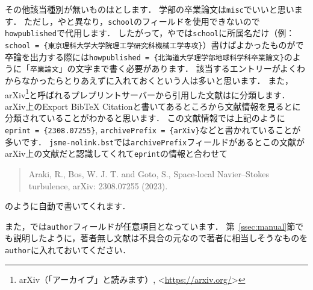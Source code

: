 \documentclass[a4paper,fleqn,uplatex,dvipdfmx]{jsarticle}
\newcommand{\jsmefile}{\texttt{jsme-nolink.bst}}
\begin{document}
その他該当種別が無いものは\ttmisc とします．
学部の卒業論文は\verb|misc|でいいと思います．
ただし，\ttmastersthesis や\ttphdthesis と異なり，\verb|school|のフィールドを使用できないので\verb|howpublished|で代用します．
したがって，\ttmastersthesis や\ttphdthesis では\verb|school|に所属名だけ（例：\verb|school = {東京理科大学大学院理工学研究科機械工学専攻}|）書けばよかったものが\ttmisc で卒論を出力する際には\verb|howpublished = {北海道大学理学部地球科学科卒業論文}|のように「\verb|卒業論文|」の文字まで書く必要があります．
該当するエントリーがよくわからなかったらとりあえず\ttmisc に入れておくという人は多いと思います．
また，arXiv\footnote{arXiv（「アーカイブ」と読みます）, \textless\url{https://arxiv.org/}\textgreater}と呼ばれるプレプリントサーバーから引用した文献は\ttmisc に分類します．
arXiv上のExport BibTeX Citationと書いてあるところから文献情報を見ると\ttmisc に分類されていることがわかると思います．
この文献情報では上記のように\verb|eprint = {2308.07255}|, \verb|archivePrefix = {arXiv}|などと書かれていることが多いです．
\jsmefile では\verb|archivePrefix|フィールドがあるとこの文献がarXiv上の文献だと認識してくれて\verb|eprint|の情報と合わせて
\begin{quote}
    Araki, R., Bos, W. J. T. and Goto, S., Space-local Navier--Stokes turbulence, arXiv: 2308.07255 (2023).
\end{quote}
のように自動で書いてくれます．

また，\ttmisc では\verb|author|フィールドが任意項目となっています．
第~\ref{ssec:manual}節\ttmanual でも説明したように，著者無し文献は不具合の元なので著者に相当しそうなものを\verb|author|に入れておいてください．
\end{document}
